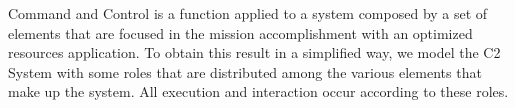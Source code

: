 Command and Control is a function applied to a system composed by a set of elements that are focused in the mission accomplishment with an optimized resources application. To obtain this result in a simplified way, we model the C2 System with some roles that are distributed among the various elements that make up the system. All execution and interaction occur according to these roles.